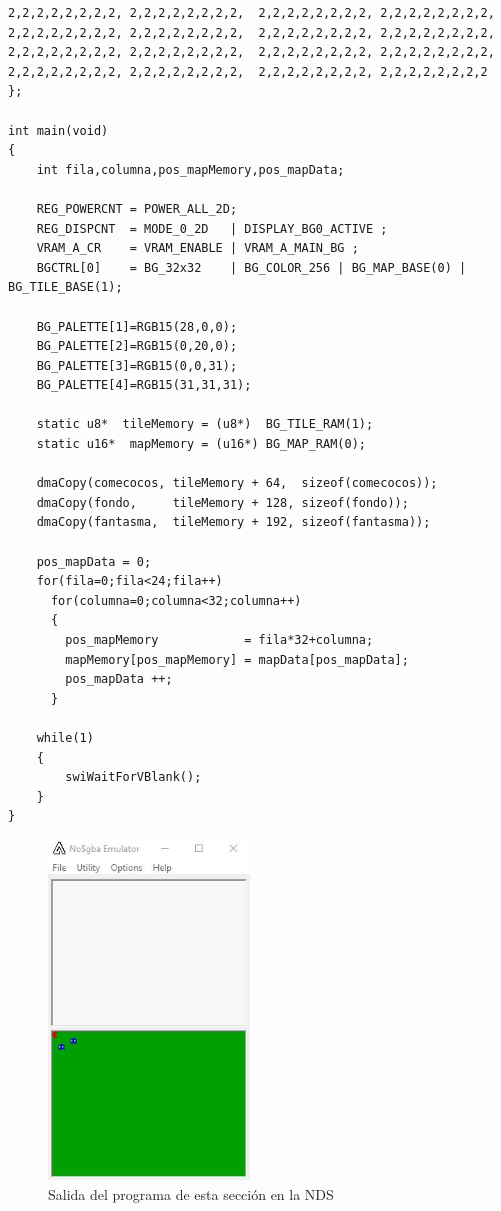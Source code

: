 \begin{example}
\begin{lstlisting}
2,2,2,2,2,2,2,2, 2,2,2,2,2,2,2,2,  2,2,2,2,2,2,2,2, 2,2,2,2,2,2,2,2,
2,2,2,2,2,2,2,2, 2,2,2,2,2,2,2,2,  2,2,2,2,2,2,2,2, 2,2,2,2,2,2,2,2,
2,2,2,2,2,2,2,2, 2,2,2,2,2,2,2,2,  2,2,2,2,2,2,2,2, 2,2,2,2,2,2,2,2,
2,2,2,2,2,2,2,2, 2,2,2,2,2,2,2,2,  2,2,2,2,2,2,2,2, 2,2,2,2,2,2,2,2
};

int main(void)
{
	int fila,columna,pos_mapMemory,pos_mapData;

	REG_POWERCNT = POWER_ALL_2D;
	REG_DISPCNT  = MODE_0_2D   | DISPLAY_BG0_ACTIVE ;
	VRAM_A_CR    = VRAM_ENABLE | VRAM_A_MAIN_BG ;
	BGCTRL[0]    = BG_32x32    | BG_COLOR_256 | BG_MAP_BASE(0) | BG_TILE_BASE(1);

	BG_PALETTE[1]=RGB15(28,0,0);
	BG_PALETTE[2]=RGB15(0,20,0);
	BG_PALETTE[3]=RGB15(0,0,31);
	BG_PALETTE[4]=RGB15(31,31,31);

	static u8*  tileMemory = (u8*)  BG_TILE_RAM(1);
	static u16*  mapMemory = (u16*) BG_MAP_RAM(0);

	dmaCopy(comecocos, tileMemory + 64,  sizeof(comecocos));
	dmaCopy(fondo,     tileMemory + 128, sizeof(fondo));
	dmaCopy(fantasma,  tileMemory + 192, sizeof(fantasma));

	pos_mapData = 0;
	for(fila=0;fila<24;fila++)
	  for(columna=0;columna<32;columna++)
	  {
        pos_mapMemory            = fila*32+columna;
        mapMemory[pos_mapMemory] = mapData[pos_mapData];
        pos_mapData ++;
	  }

	while(1)
	{
		swiWaitForVBlank();
	}
}
\end{lstlisting}
\end{example}

\begin{figure}[t]
	\centering
	\includegraphics[height=9cm]{Figuras/C7/c7_teselas.jpg}
	\caption{Salida del programa de esta sección en la NDS}
	\label{fig_p2_c3_comecocos}
\end{figure}


